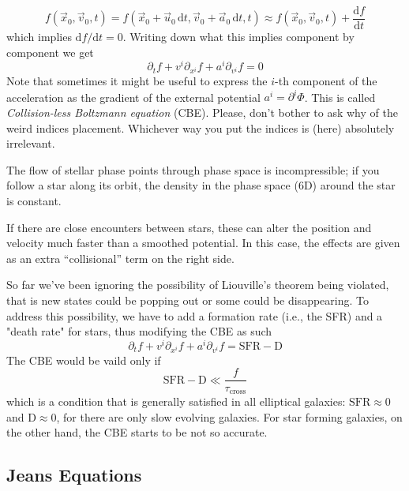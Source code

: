 \begin{equation*}
    f(\vec{x}_{0}, \vec{v}_{0}, t) = f(\vec{x}_{0}+\vec{u}_{0}\,\text{d}t, \vec{v}_{0}+\vec{a}_{0}\,\text{d}t, t) \approx f(\vec{x}_{0}, \vec{v}_{0}, t) +\frac{\text{d}f}{\text{d}t}
\end{equation*}
which implies $\text{d}f/\text{d}t = 0$. Writing down what this implies component by component we get 
\begin{equation}
    \boxed{
    \partial_{t}f + v^{i}\partial_{x^{i}}f+a^{i}\partial_{v^{i}}f = 0
    }
    \label{eq:vlasov}
\end{equation}
Note that sometimes it might be useful to express the $i$-th component of the acceleration as the gradient of the external potential $a^{i} = \partial^{i}\Phi$.
This is called \emph{Collision-less Boltzmann equation} (CBE). Please, don't bother to ask why of the weird indices placement. Whichever way you put the indices is (here) absolutely irrelevant.
\par The flow of stellar phase points through phase space is incompressible; if you follow a star along its orbit, the density in the phase space (6D) around the star is constant.
\par If there are close encounters between stars, these can alter the position and velocity much faster than a smoothed potential. In this case, the effects are given as an extra “collisional” term on the right side.
\par So far we've been ignoring the possibility of Liouville's theorem being violated, that is new states could be popping out or some could be disappearing. To address this possibility, we have to add a formation rate (i.e., the SFR) and a "death rate" for stars, thus modifying the CBE as such
\begin{equation*}
    \partial_{t}f + v^{i}\partial_{x^{i}}f+a^{i}\partial_{v^{i}}f = \text{SFR}-\text{D}
\end{equation*}
The CBE would be vaild only if
\begin{equation*}
    \text{SFR}-\text{D} \ll \frac{f}{\tau_{\text{cross}}}
\end{equation*}
which is a condition that is generally satisfied in all elliptical galaxies: $\text{SFR}\approx 0$ and $\text{D}\approx 0$, for there are only slow evolving galaxies. For star forming galaxies, on the other hand, the CBE starts to be not so accurate.

\subsection{Jeans Equations}

